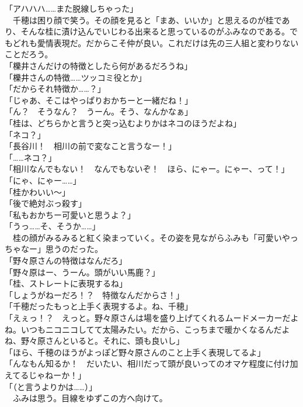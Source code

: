 「アハハハ……また脱線しちゃった」\\
　千穂は困り顔で笑う。その顔を見ると「まあ、いいか」と思えるのが桂であり、そんな桂に漬け込んでいじわる出来ると思っているのがふみなのである。でもどれも愛情表現だ。だからこそ仲が良い。これだけは先の三人組と変わりないことだろう。\\
「櫟井さんだけの特徴としたら何があるだろうね」\\
「櫟井さんの特徴……ツッコミ役とか」\\
「だからそれ特徴か……？」\\
「じゃあ、そこはやっぱりおかちーと一緒だね！」\\
「ん？　そうなん？　うーん。そう、なんかなぁ」\\
「桂は、どちらかと言うと突っ込むよりかはネコのほうだよね」\\
「ネコ？」\\
「長谷川！　相川の前で変なこと言うなー！」\\
「……ネコ？」\\
「相川なんでもない！　なんでもないぞ！　ほら、にゃー。にゃー、って！」\\
「にゃ、にゃー……」\\
「桂かわいい～」\\
「後で絶対ぶっ殺す」\\
「私もおかちー可愛いと思うよ？」\\
「うっ……そ、そうか……」\\
　桂の顔がみるみると紅く染まっていく。その姿を見ながらふみも「可愛いやっちゃなー」思うのだった。\\
「野々原さんの特徴はなんだろ」\\
「野々原はー、うーん。頭がいい馬鹿？」\\
「桂、ストレートに表現するね」\\
「しょうがねーだろ！？　特徴なんだからさ！」\\
「千穂だったもっと上手く表現するよ。ね、千穂」\\
「えぇっ！？　えっと。野々原さんは場を盛り上げてくれるムードメーカーだよね。いつもニコニコしてて太陽みたい。だから、こっちまで暖かくなるんだよね、野々原さんといると。それに、頭も良いし」\\
「ほら、千穂のほうがよっぽど野々原さんのこと上手く表現してるよ」\\
「んなもん知るか！　だいたい、相川だって頭が良いってのオマケ程度に付け加えてるじゃねーか！」\\
「（と言うよりかは……）」\\
　ふみは思う。目線をゆずこの方へ向けて。\\

